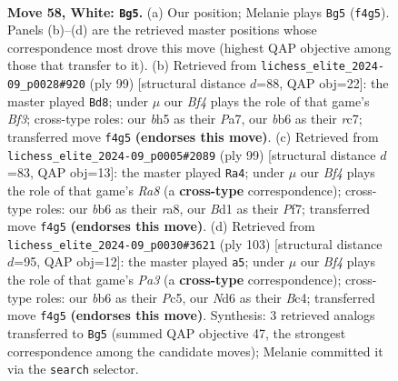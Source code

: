 \documentclass[11pt]{article}
\begin{document}
\clearpage

\begin{figure}[p]\centering
\begin{subfigure}{0.46\textwidth}\centering
\resizebox{\linewidth}{!}{%
\newchessgame
\chessboard[
  setfen={n4k2/1p1n4/1b1N4/p2p3b/5B1p/PP2P3/4P3/3B2K1 w - - 12 58},
  showmover=false,
  pgfstyle=straightmove, color=movearrow, markmove={f4-g5}
]}
\caption{}
\end{subfigure}\hfill
\begin{subfigure}{0.46\textwidth}\centering
\resizebox{\linewidth}{!}{%
\newchessgame
\chessboard[
  setfen={8/p1R3pk/P3pb2/2Nrn3/7p/1K2B2P/1P6/8 b - - 0 50},
  showmover=false,
  pgfstyle=straightmove, color=movearrow, markmove={f6-d8}
]}
\caption{}
\end{subfigure}
\\[4pt]
\begin{subfigure}{0.46\textwidth}\centering
\resizebox{\linewidth}{!}{%
\newchessgame
\chessboard[
  setfen={R7/5p1k/6np/pp5N/2bKBPPP/8/8/r7 b - - 12 50},
  showmover=false,
  pgfstyle=straightmove, color=movearrow, markmove={a1-a4}
]}
\caption{}
\end{subfigure}\hfill
\begin{subfigure}{0.46\textwidth}\centering
\resizebox{\linewidth}{!}{%
\newchessgame
\chessboard[
  setfen={8/7k/p5p1/2p3P1/2b4p/5BnP/4pK2/3rB3 b - - 3 52},
  showmover=false,
  pgfstyle=straightmove, color=movearrow, markmove={a6-a5}
]}
\caption{}
\end{subfigure}
\caption{\textbf{Move 58, White: \texttt{Bg5}.} (a) Our position; Melanie plays \texttt{Bg5} (\texttt{f4g5}). Panels (b)--(d) are the retrieved master positions whose correspondence most drove this move (highest QAP objective among those that transfer to it). (b) Retrieved from \texttt{lichess\_elite\_2024-09\_p0028\#920} (ply 99) [structural distance $d$=88, QAP obj=22]: the master played \texttt{Bd8}; under $\mu$ our \emph{Bf4} plays the role of that game's \emph{Bf3}; cross-type roles: our \emph{b}h5 as their \emph{P}a7, our \emph{b}b6 as their \emph{r}c7; transferred move \texttt{f4g5} \textbf{(endorses this move)}. (c) Retrieved from \texttt{lichess\_elite\_2024-09\_p0005\#2089} (ply 99) [structural distance $d$=83, QAP obj=13]: the master played \texttt{Ra4}; under $\mu$ our \emph{Bf4} plays the role of that game's \emph{Ra8} (a \textbf{cross-type} correspondence); cross-type roles: our \emph{b}b6 as their \emph{r}a8, our \emph{B}d1 as their \emph{P}f7; transferred move \texttt{f4g5} \textbf{(endorses this move)}. (d) Retrieved from \texttt{lichess\_elite\_2024-09\_p0030\#3621} (ply 103) [structural distance $d$=95, QAP obj=12]: the master played \texttt{a5}; under $\mu$ our \emph{Bf4} plays the role of that game's \emph{Pa3} (a \textbf{cross-type} correspondence); cross-type roles: our \emph{b}b6 as their \emph{P}c5, our \emph{N}d6 as their \emph{B}c4; transferred move \texttt{f4g5} \textbf{(endorses this move)}. Synthesis: 3 retrieved analogs transferred to \texttt{Bg5} (summed QAP objective 47, the strongest correspondence among the candidate moves); Melanie committed it via the \texttt{search} selector.}
\label{fig:thought-m114}
\end{figure}
\end{document}
